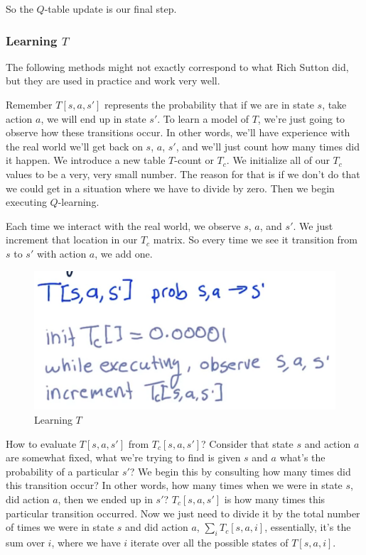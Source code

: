 \documentclass[12pt]{article}
\begin{document}
So the $Q$-table update is our final step.

\subsubsection{Learning $T$}

The following methods might not exactly correspond to what Rich Sutton did, but they are used in practice and work very well. 

Remember $T[s, a, s']$ represents the probability that if we are in state $s$, take action $a$, we will end up in state $s'$. To learn a model of $T$, we're just going to observe how these transitions occur. In other words, we'll have experience with the real world we'll get back on $s$, $a$, $s'$, and we'll just count how many times did it happen. We introduce a new table $T$-count or $T_c$. We initialize all of our $T_c$ values to be a very, very small number. The reason for that is if we don't do that we could get in a situation where we have to divide by zero. Then we begin executing $Q$-learning. 

Each time we interact with the real world, we observe $s$, $a$, and $s'$. We just increment that location in our $T_c$ matrix. So every time we see it transition from $s$ to $s'$ with action $a$, we add one.  

\begin{figure}[!ht]
\centering
\includegraphics[scale=0.4]{fig/fig115}
\caption{Learning $T$}
\end{figure}

How to evaluate $T[s, a, s']$ from $T_c[s, a, s']$? Consider that state $s$ and action $a$ are somewhat fixed, what we're trying to find is given $s$ and $a$ what's the probability of a particular $s'$? We begin this by consulting how many times did  this transition occur? In other words, how many times when we were in state $s$, did action $a$, then we ended up in $s'$? $T_c[s, a, s']$ is how many times this particular transition occurred. Now we just need to divide it by the total number of times we were in state $s$ and did action $a$, $\sum_iT_c[s, a, i]$, essentially, it's the sum over $i$, where we have $i$ iterate over all the possible states of $T[s, a, i]$. 
\end{document}

